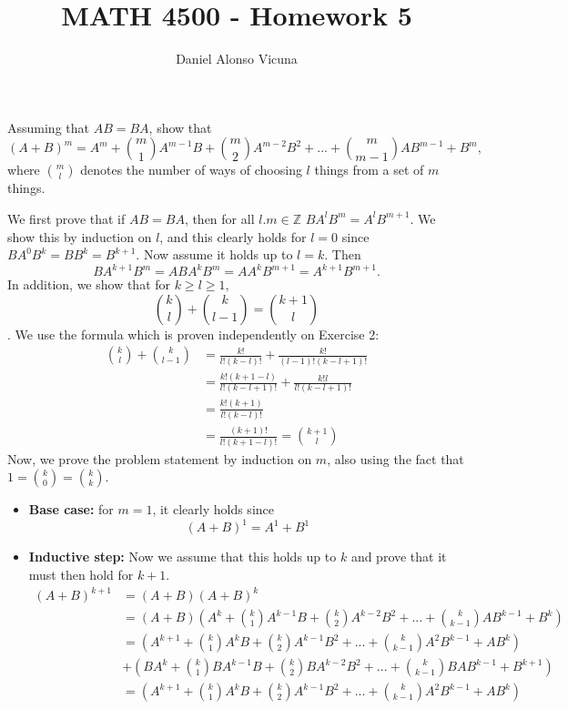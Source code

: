 \documentclass[11pt,onecolumn]{article}
\title{MATH 4500 - Homework 5}
\author{Daniel Alonso Vicuna}
\begin{document}
\maketitle

\begin{exercise}
Assuming that $AB=BA$, show that $$(A+B)^m =A^m+\binom{m}{1} A^{m-1}B+\binom{m}{2}A^{m-2}B^2+...+\binom{m}{m-1} AB^{m-1}+B^m,$$ where $\binom{m}{l}$ denotes the number of ways of choosing $l$ things from a set of $m$ things. 
\end{exercise}
\begin{answer}
We first prove that if $AB=BA$, then for all $l.m \in \mathbb{Z}$ $BA^lB^m = A^lB^{m+1}$. We show this by induction on $l$, and this clearly holds for $l=0$ since $BA^0B^k = BB^k = B^{k+1}$. Now assume it holds up to $l=k$. Then $$BA^{k+1}B^m = ABA^{k}B^m = AA^kB^{m+1} = A^{k+1}B^{m+1}.$$
In addition, we show that for $k \ge l \ge 1,$ $$ \binom{k}{l} + \binom{k}{l-1} = \binom{k+1}{l}$$. We use the formula which is proven independently on Exercise 2:
\begin{align*}
    \binom{k}{l} + \binom{k}{l-1} &= \frac{k!}{l!(k-l)!} + \frac{k!}{(l-1)!(k-l+1)!} \\
    &= \frac{k!(k+1-l)}{l!(k-l+1)!} + \frac{k!l}{l!(k-l+1)!}  \\
    &= \frac{k!(k+1)}{l!(k-l)!} \\
    &= \frac{(k+1)!}{l!(k+1-l)!} = \binom{k+1}{l}
\end{align*}
Now, we prove the problem statement by induction on $m$, also using the fact that $1 = \binom{k}{0} = \binom{k}{k} $.
\begin{itemize}
    \item \textbf{Base case:} for $m=1$, it clearly holds since $$ (A+B)^1 = A^1 + B^1 $$
    \item \textbf{Inductive step:} Now we assume that this holds up to $k$ and prove that it must then hold for $k+1$.
    \begin{align*}
        (A+B)^{k+1} &= (A+B)(A+B)^k \\
        &= (A+B)(A^k + \binom{k}{1} A^{k-1}B + \binom{k}{2}A^{k-2}B^2 + ... + \binom{k}{k-1}AB^{k-1} + B^k) \\
        &= (A^{k+1} + \binom{k}{1} A^{k}B + \binom{k}{2}A^{k-1}B^2 + ... + \binom{k}{k-1}A^2B^{k-1} + AB^k) \\
        &+ (BA^k + \binom{k}{1} BA^{k-1}B + \binom{k}{2}BA^{k-2}B^2 + ... + \binom{k}{k-1}BAB^{k-1} + B^{k+1}) \\
        &= (A^{k+1} + \binom{k}{1} A^{k}B + \binom{k}{2}A^{k-1}B^2 + ... + \binom{k}{k-1}A^2B^{k-1} + AB^k) \\

\end{align*}
\end{itemize}
\end{answer}
\end{document}

